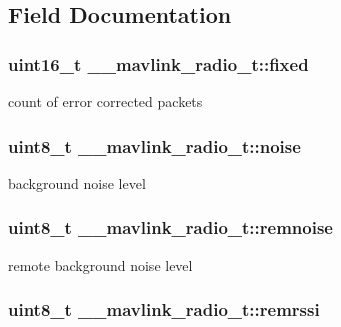 \subsection{Field Documentation}
\hypertarget{struct____mavlink__radio__t_a2352c5e14697c698e323b5bfaa1caeb0}{
\subsubsection[{fixed}]{\setlength{\rightskip}{0pt plus 5cm}uint16\+\_\+t \+\_\+\+\_\+mavlink\+\_\+radio\+\_\+t\+::fixed}}\label{struct____mavlink__radio__t_a2352c5e14697c698e323b5bfaa1caeb0}


count of error corrected packets 

\hypertarget{struct____mavlink__radio__t_a08110d0faedb2a5f9fe7b92802abcec0}{
\subsubsection[{noise}]{\setlength{\rightskip}{0pt plus 5cm}uint8\+\_\+t \+\_\+\+\_\+mavlink\+\_\+radio\+\_\+t\+::noise}}\label{struct____mavlink__radio__t_a08110d0faedb2a5f9fe7b92802abcec0}


background noise level 

\hypertarget{struct____mavlink__radio__t_a25196996547b38eb6b20a507fceda210}{
\subsubsection[{remnoise}]{\setlength{\rightskip}{0pt plus 5cm}uint8\+\_\+t \+\_\+\+\_\+mavlink\+\_\+radio\+\_\+t\+::remnoise}}\label{struct____mavlink__radio__t_a25196996547b38eb6b20a507fceda210}


remote background noise level 

\hypertarget{struct____mavlink__radio__t_a686f687a4f88faaf0db6f2d553dcfc5a}{
\subsubsection[{remrssi}]{\setlength{\rightskip}{0pt plus 5cm}uint8\+\_\+t \+\_\+\+\_\+mavlink\+\_\+radio\+\_\+t\+::remrssi}}\label{struct____mavlink__radio__t_a686f687a4f88faaf0db6f2d553dcfc5a}


